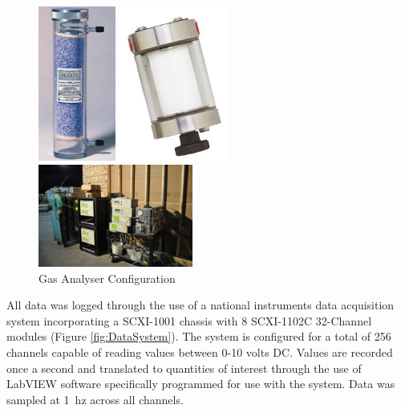 \documentclass[12pt,oneside]{book}
\begin{document}
\begin{figure}[H]
	\begin{minipage}[b]{0.5\linewidth}
		\centering
		\includegraphics[height = 2in]{0_Images/Instrumentation/Gas_Analyzer/DriRightTube.jpg}	
	\end{minipage}

	\begin{minipage}[b]{0.5\linewidth}
		\centering
		\includegraphics[height = 2in]{0_Images/Instrumentation/Gas_Analyzer/FineFilter.jpg}
	\end{minipage}

	\begin{minipage}[b]{0.5\linewidth}
	\centering
		\includegraphics[width = 2in]{0_Images/Instrumentation/Gas_Analyzer/GasAnalyzers.jpg}
	\end{minipage}
	\caption{Gas Analyser Configuration}
	\label{fig:GasAnalyzers}

\end{figure}

All data was logged through the use of a national instruments data acquisition system incorporating a SCXI-1001 chassis with 8 SCXI-1102C 32-Channel modules (Figure \ref{fig:DataSystem}). The system is configured for a total of 256 channels capable of reading values between 0-10 volts DC. Values are recorded once a second and translated to quantities of interest through the use of LabVIEW software specifically programmed for use with the system. Data was sampled at 1~hz across all channels.
\end{document}

